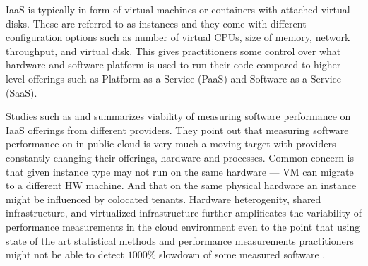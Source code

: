 IaaS is typically in form of virtual machines or containers with attached virtual disks.
These are referred to as instances and they come with different configuration options such as number of virtual CPUs, size of memory, network throughput, and virtual disk.
This gives practitioners some control over what hardware and software platform is used to run their code compared to higher level offerings such as Platform-as-a-Service (PaaS) and Software-as-a-Service (SaaS).

Studies such as \citet{leitner2016patterns} and \citet{laaber2019software} summarizes viability of measuring software performance on IaaS offerings from different providers.
They point out that measuring software performance on in public cloud is very much a moving target with providers constantly changing their offerings, hardware and processes.
Common concern is that given instance type may not run on the same hardware --- VM can migrate to a different HW machine.
And that on the same physical hardware an instance might be influenced by colocated tenants.
Hardware heterogenity, shared infrastructure, and virtualized infrastructure further amplificates the variability of performance measurements in the cloud environment \citet{leitner2016patterns} even to the point that using state of the art statistical methods and performance measurements practitioners might not be able to detect $1000\%$ slowdown of some measured software \citet{laaber2019software}.

